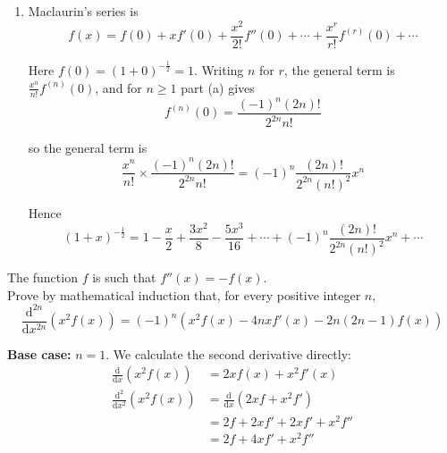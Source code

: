 \documentclass[leqno]{article}
\begin{document}
\begin{enumerate}[
  label=\textbf{\arabic*.},
  leftmargin=*,
  topsep=0pt,
  partopsep=0pt,
  parsep=0pt
]
\begin{djsSolution}
\begin{enumerate}[label=\textbf{(\alph*)}]
  Now simplify the coefficient:
  \begin{align*}
  \frac{(2k)!(2k+1)}{2^{2k+1}k!}
  &=\frac{2(k+1)(2k+1)(2k)!}{2^{2k+2}(k+1)k!} \\
  &=\frac{(2k+2)(2k+1)(2k)!}{2^{2k+2}(k+1)!} \\
  &=\frac{(2k+2)!}{2^{2k+2}(k+1)!}
  \end{align*}

  Hence
  \[
  f^{(k+1)}(x)=\frac{(-1)^{k+1}(2k+2)!}{2^{2k+2}(k+1)!(1+x)^{k+\frac32}}
  \]

  so the statement is true for \(n=k+1\).

  \textbf{Conclusion:} If the statement is true for \(n=k\), then it is true for \(n=k+1\). Since it is true for \(n=1\), by the principle of mathematical induction the statement is true for all \(n\ge 1\).

  \item Maclaurin's series is
  \[
  f(x)=f(0)+xf'(0)+\frac{x^2}{2!}f''(0)+\cdots+\frac{x^r}{r!}f^{(r)}(0)+\cdots
  \]

  Here \(f(0)=(1+0)^{-\frac12}=1\). Writing \(n\) for \(r\), the general term is \(\frac{x^n}{n!}f^{(n)}(0)\), and for \(n\ge 1\) part (a) gives
  \[
  f^{(n)}(0)=\frac{(-1)^n(2n)!}{2^{2n}n!}
  \]

  so the general term is
  \[
  \frac{x^n}{n!}\times\frac{(-1)^n(2n)!}{2^{2n}n!}
  =(-1)^n\frac{(2n)!}{2^{2n}(n!)^2}x^n
  \]

  Hence
  \[
  (1+x)^{-\frac12}
  =1-\frac{x}{2}+\frac{3x^2}{8}-\frac{5x^3}{16}+\cdots+(-1)^n\frac{(2n)!}{2^{2n}(n!)^2}x^n+\cdots
  \]

\end{enumerate}
\end{djsSolution}


\newpage

\questionitem

The function $f$ is such that $f''(x)=-f(x)$. \\

Prove by mathematical induction that, for every positive integer $n$,
\[
\frac{\mathrm{d}^{2n}}{\mathrm{d}x^{2n}}\left(x^2f(x)\right)=(-1)^n\left(x^2f(x)-4nxf'(x)-2n(2n-1)f(x)\right)
\] 

\vspace*{10pt}

\begin{djsSolution}
\textbf{Base case:} \(n=1\). We calculate the second derivative directly:
\begin{align*}
\frac{\mathrm{d}}{\mathrm{d}x}\left(x^2f(x)\right)
&=2xf(x)+x^2f'(x)
\\
\frac{\mathrm{d}^2}{\mathrm{d}x^2}\left(x^2f(x)\right)
&=\frac{\mathrm{d}}{\mathrm{d}x}\left(2xf+x^2f'\right)
\\
&=2f+2xf'+2xf'+x^2f''
\\
&=2f+4xf'+x^2f''
\end{align*}


\end{djsSolution}
\end{enumerate}
\end{document}
